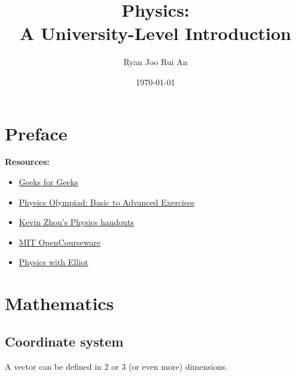 \documentclass[12pt,a4 paper]{extreport}
\begin{document}


\begin{titlepage}
\title{Physics:\\
A University-Level Introduction}
\author{Ryan Joo Rui An}
\date{\today}
\end{titlepage}

\maketitle

\chapter*{Preface}
\textbf{Resources:}
\begin{itemize}
\item \href{https://www.geeksforgeeks.org/}{Geeks for Geeks}
\item \href{https://irp-cdn.multiscreensite.com/721e955d/files/uploaded/Physics-Olympiad-Basic-To-Advanced-Exercises.pdf}{Physics Olympiad: Basic to Advanced Exercises}
\item \href{https://knzhou.github.io/}{Kevin Zhou's Physics handouts} %
\item \href{https://ocw.mit.edu/}{MIT OpenCourseware}
\item \href{https://www.physicswithelliot.com/all-notes}{Physics with Elliot}
\end{itemize}

\tableofcontents

\chapter{Mathematics}
\section{Coordinate system}
A vector can be defined in 2 or 3 (or even more) dimensions.
\end{document}

